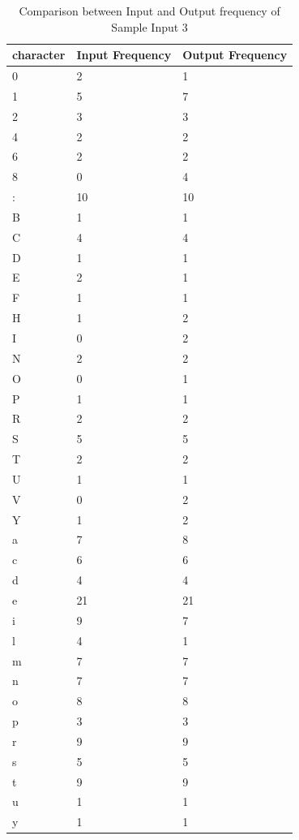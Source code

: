 \begin{table}[H]
\centering
\begin{tabular}{|p{2cm}|p{2cm}|p{2cm}|}
\hline
character & Input Frequency & Output Frequency \\
\hline
0 & 2 & 1\\
\hline
1 & 5 & 7\\
\hline
2 & 3 & 3\\
\hline
4 & 2 & 2\\ 
\hline
6 & 2 & 2\\
\hline
8 & 0 & 4\\
\hline
: & 10 & 10\\
\hline
B & 1 & 1\\
\hline
C & 4 & 4\\
\hline
D & 1 & 1\\
\hline
E & 2 & 1\\
\hline
F & 1 & 1\\
\hline
H & 1 & 2\\
\hline
I & 0 & 2\\
\hline
N & 2 & 2\\
\hline
O & 0 & 1\\
\hline
P & 1 & 1\\
\hline
R & 2 & 2\\
\hline
S & 5 & 5\\
\hline
T & 2 & 2\\
\hline
U & 1 & 1\\
\hline
V & 0 & 2\\
\hline
Y & 1 & 2\\
\hline
a & 7 & 8\\
\hline
c & 6 & 6\\
\hline
d & 4 & 4\\
\hline
e & 21 & 21\\
\hline
i & 9 & 7\\
\hline
l & 4 & 1\\
\hline
m & 7 & 7\\
\hline
n & 7 & 7\\
\hline
o & 8 & 8\\
\hline
p & 3 & 3\\
\hline
r & 9 & 9\\
\hline
s & 5 & 5\\
\hline
t & 9 & 9\\
\hline
u & 1 & 1\\
\hline
y & 1 & 1\\
\hline
\end{tabular}
\caption {Comparison between Input and Output frequency of Sample Input 3}
\label {tab:Table3}
\end{table}

